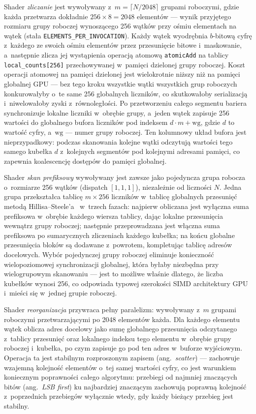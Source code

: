 Shader \textit{zliczanie} jest wywoływany z~$m = \lceil N/2048 \rceil$ grupami roboczymi,
gdzie każda przetwarza dokładnie $256 \times 8 = 2048$ elementów --- wynik przyjętego
rozmiaru grupy roboczej wynoszącego 256 wątków przy ośmiu elementach na wątek (stała
\texttt{ELEMENTS\_PER\_INVOCATION}). Każdy wątek wyodrębnia $b$-bitową cyfrę
z~każdego ze swoich ośmiu elementów przez przesunięcie bitowe i~maskowanie, a~następnie
zlicza jej wystąpienia operacją atomową \texttt{atomicAdd} na tablicy
\texttt{local\_counts[256]} przechowywanej w~pamięci dzielonej grupy roboczej. Koszt
operacji atomowej na pamięci dzielonej jest wielokrotnie niższy niż na pamięci globalnej
GPU --- bez tego kroku wszystkie wątki wszystkich grup roboczych konkurowałyby o~te same
256 globalnych liczników, co skutkowałoby serializacją i~niwelowałoby zyski z~równoległości.
Po przetworzeniu całego segmentu bariera synchronizuje lokalne liczniki w~obrębie grupy,
a~jeden wątek zapisuje 256 wartości do globalnego bufora liczników pod indeksem
$d \cdot m + \mathrm{wg}$, gdzie $d$ to wartość cyfry, a~$\mathrm{wg}$ --- numer
grupy roboczej. Ten kolumnowy układ bufora jest nieprzypadkowy: podczas skanowania
kolejne wątki odczytują wartości tego samego kubełka $d$ z~kolejnych segmentów pod
kolejnymi adresami pamięci, co zapewnia koalescencję dostępów do pamięci globalnej.

Shader \textit{skan prefiksowy} wywoływany jest zawsze jako pojedyncza grupa robocza
o~rozmiarze 256 wątków (dispatch $[1,1,1]$), niezależnie od liczności $N$. Jedna grupa
przekształca tablicę $m \times 256$ liczników w~tablicę globalnych przesunięć metodą
Hillisa--Steele'a~\cite{harada2011introduction} w~trzech fazach: najpierw obliczana jest
wyłączna suma prefiksowa w~obrębie każdego wiersza tablicy, dając lokalne przesunięcia
wewnątrz grupy roboczej; następnie przeprowadzana jest włączna suma prefiksowa po
sumarycznych zliczeniach każdego kubełka; na końcu globalne przesunięcia bloków są
dodawane z~powrotem, kompletując tablicę adresów docelowych. Wybór pojedynczej grupy
roboczej eliminuje konieczność wielopoziomowej synchronizacji globalnej, która byłaby
niezbędna przy wielogrupowym skanowaniu --- jest to możliwe właśnie dlatego, że liczba
kubełków wynosi 256, co odpowiada typowej szerokości SIMD architektury GPU i~mieści się
w~jednej grupie roboczej.

Shader \textit{reorganizacja} przywraca pełny paralelizm: wywoływany z~$m$ grupami
roboczymi przetwarzającymi po 2048 elementów każda. Dla każdego elementu wątek oblicza
adres docelowy jako sumę globalnego przesunięcia odczytanego z~tablicy przesunięć oraz
lokalnego indeksu tego elementu w~obrębie grupy roboczej i~kubełka, po czym zapisuje
go pod ten adres w~buforze wyjściowym. Operacja ta jest stabilnym rozproszonym zapisem (ang.~\textit{scatter}) ---
zachowuje wzajemną kolejność elementów o~tej samej wartości cyfry, co jest
warunkiem koniecznym poprawności całego algorytmu: przebiegi od najmniej znaczących
bitów (ang.~\textit{LSB first}) ku najbardziej znaczącym zachowują poprawną kolejność
z~poprzednich przebiegów wyłącznie wtedy, gdy każdy bieżący przebieg jest stabilny.

